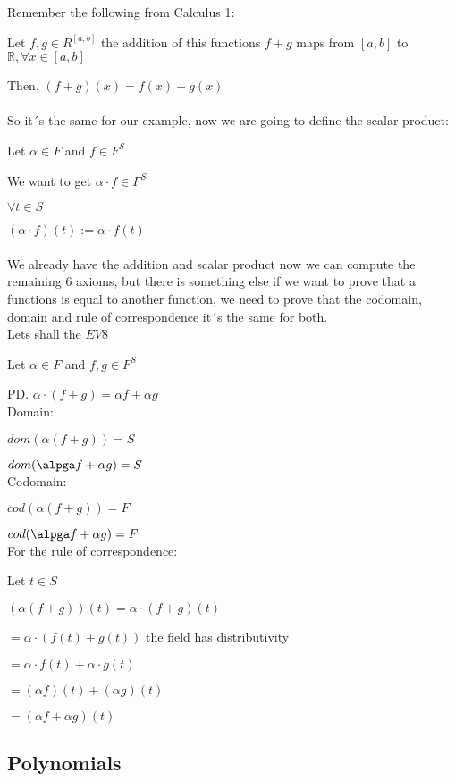 \documentclass{article}
\begin{document}
Remember the following from Calculus 1:

Let \(f,g \in R^{[a,b]}\) the addition of this functions \(f+g\) maps from \([a,b]\) to \( \mathbb{R}, \forall x \in [a,b]\)

Then, \((f+g)(x) = f(x) + g(x)\)
\\
\\
So it´s the same for our example, now we are going to define the scalar product:

Let \(\alpha \in F\) and \(f \in F^S\)

We want to get \(\alpha \cdot f \in F^S\)

\(\forall t \in S\)

\((\alpha \cdot f)(t) := \alpha \cdot f(t)\)
\\
\\
We already have the addition and scalar product now we can compute the remaining 6 axioms, but there is something else if we want to prove that a functions is equal to another function, we need to prove that the codomain, domain and rule of correspondence it´s the same for both.
\\

Lets shall the \(EV8\)

Let \(\alpha \in F\) and \(f,g \in F^S\)

PD. \(\alpha \cdot (f+g) = \alpha f +\alpha g\)
\\

Domain:

\(dom(\alpha(f+g)) = S\)

\(dom(\alpga f + \alpha g) = S\)
\\

Codomain:

\(cod(\alpha(f+g)) = F\)

\(cod(\alpga f + \alpha g) = F\)
\\

For the rule of correspondence:

Let \(t \in S\)

\((\alpha(f+g))(t) = \alpha \cdot (f+g)(t)\)

\(=\alpha \cdot (f(t) + g(t))\) the field has distributivity

\(= \alpha \cdot f(t) + \alpha \cdot g(t)\)

\(=(\alpha f)(t) + (\alpha g)(t)\)

\(=(\alpha f + \alpha g)(t)\)

\subsection*{Polynomials}
\end{document}
